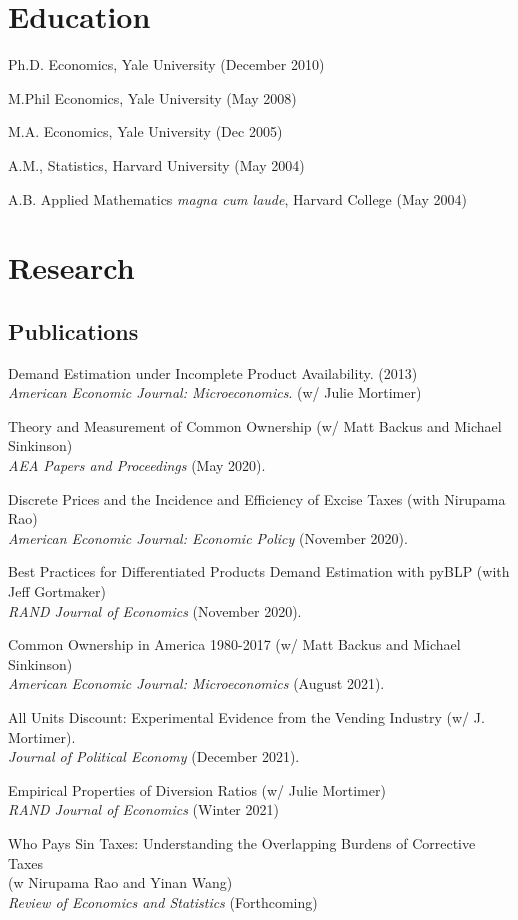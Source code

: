 \documentclass[letterpaper]{article}
\renewenvironment{itemize}{
  \begin{list}{}{
    \setlength{\leftmargin}{1.5em}
  }
}{
  \end{list}
}
\begin{document}
\section*{Education}

\begin{itemize}
\item Ph.D. Economics, Yale University (December 2010)
\item M.Phil Economics, Yale University (May 2008)
\item M.A. Economics, Yale University (Dec 2005)
\item A.M., Statistics, Harvard University (May 2004)
\item A.B. Applied Mathematics \textit{magna cum laude}, Harvard College (May 2004)

\end{itemize}



\section*{Research}
\subsection*{Publications}
\begin{itemize}
\item Demand Estimation under Incomplete Product Availability. (2013)\\
 \textit{American Economic Journal: Microeconomics}. (w/ Julie Mortimer)
\item Theory and Measurement of Common Ownership (w/ Matt Backus and Michael Sinkinson) \\\textit{AEA Papers and Proceedings} (May 2020).
\item Discrete Prices and the Incidence and Efficiency of Excise Taxes  (with Nirupama Rao)  \\\textit{American Economic Journal: Economic Policy} (November 2020). 
\item Best Practices for Differentiated Products Demand Estimation with pyBLP (with Jeff Gortmaker) \\\textit{RAND Journal of Economics} (November 2020).
\item Common Ownership in America 1980-2017 (w/ Matt Backus and Michael Sinkinson) \\\textit{American Economic Journal: Microeconomics} (August 2021).
\item All Units Discount: Experimental Evidence from the Vending Industry (w/ J. Mortimer). \\\textit{Journal of Political Economy} (December 2021).
\item Empirical Properties of Diversion Ratios (w/ Julie Mortimer)\\\textit{RAND Journal of Economics} (Winter 2021)
\item Who Pays Sin Taxes: Understanding the Overlapping Burdens of Corrective Taxes\\
 (w Nirupama Rao and Yinan Wang) \\
 \textit{Review of Economics and Statistics} (Forthcoming)
\end{itemize}
\end{document}

